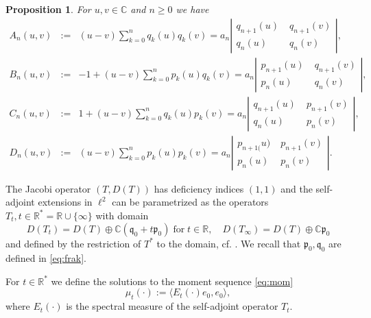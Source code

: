 \documentclass [12pt]{article}
\newtheorem{prop}[thm]{Proposition}
\newcommand{\C}{\mathbb{C}}
\newcommand{\R}{\mathbb{R}}
\def\ph{\phantom{-}}
\def\p{\ph}
\begin{document}
\begin{prop}\cite[Proposition 5.24]{Sch}\label{thm:An-Dn} For $u,v\in\C$ and $n\ge 0$ we have
\begin{eqnarray*}
A_n(u,v)&:=&(u-v)\sum_{k=0}^nq_k(u)q_k(v)=
a_n\left|\begin{array}{cc}
 q_{n+1}(u)&\;q_{n+1}(v)\\q_{n}(u)&\;q_{n}(v)\end{array}\right|,\\
B_n(u,v)&:=&-1+(u-v)\sum_{k=0}^n p_k(u)q_k(v)=
a_n\left|\begin{array}{cc}
p_{n+1}(u)&\;q_{n+1}(v)\\p_{n}(u)&\;q_{n}(v)\end{array}\right|,\\
C_n(u,v)&:=&1+(u-v)\sum_{k=0}^n q_k(u)p_k(v)=
a_n\left|\begin{array}{cc}
q_{n+1}(u)&\;p_{n+1}(v)\\
q_{n}(u)&\;p_{n}(v)\end{array}\right|,\\
D_n(u,v)&:=&(u-v)\sum_{k=0}^np_k(u)p_k(v)=
a_n\left|\begin{array}{cc}
p_{n+1(}u)&\;p_{n+1}(v)\\
p_{n}(u)&\;p_{n}(v)\end{array}\right|.
\end{eqnarray*}
\end{prop}

The Jacobi operator $(T,D(T))$ has deficiency indices $(1,1)$ and the self-adjoint extensions in
$\ell^2$ can be parametrized as the operators $T_t, t\in\R^*=\R\cup \{\infty\}$ with domain  
\begin{equation}\label{eq:domTt}
D(T_t)=D(T)\oplus \C  (\mathfrak{q}_0 + t\mathfrak{p}_0) \;\mbox{for}\;t\in\R,\quad
D(T_\infty)=D(T)\oplus \C \mathfrak{p}_0
\end{equation}
and defined by the restriction of $T^*$ to the domain, cf. \cite[Theorem 6.23]{Sch}.
We recall that $\mathfrak{p}_0, \mathfrak{q}_0$ are defined in \eqref{eq:frak}.

For $t\in\R^*$ we define the solutions to the moment sequence \eqref{eq:mom}
\begin{equation}\label{eq:Next}
\mu_t(\cdot):=\langle E_t(\cdot)e_0,e_0\rangle,
\end{equation}
where $E_t(\cdot)$ is the spectral measure of the self-adjoint operator $T_t$.
\end{document}
